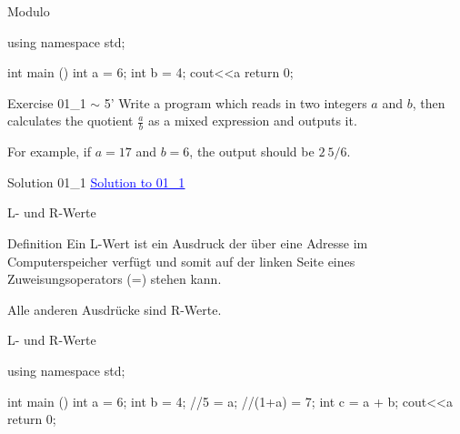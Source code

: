 \documentclass[handout,usenames,dvipsnames]{beamer}
\begin{document}
\begin{frame}[fragile]{Modulo}
\begin{TFCpp}
using namespace std;

int main (){
	int a = 6;
	int b = 4;
	cout<<a%
	return 0;
}
\end{TFCpp}

\end{frame}

\begin{frame}{Exercise 01\_1 $\sim$ 5'}
Write a program which reads in two integers $a$ and $b$, then calculates the quotient $\frac{a}{b}$ as a mixed expression and outputs it. 

\vspace{1.5ex}

For example, if $a = 17$ and $b = 6$, the output should be $2\ 5/6$.
\end{frame}

\begin{frame}{Solution 01\_1}
\href{https://codeboard.io/projects/75270}{\textcolor{blue}{\underline{Solution to 01\_1}}}
\end{frame}

\begin{frame}{L- und R-Werte}
\begin{block}{Definition}
Ein L-Wert ist ein Ausdruck der über eine Adresse im Computerspeicher verfügt und somit auf der linken Seite eines Zuweisungsoperators (=) stehen kann. 

Alle anderen Ausdrücke sind R-Werte.
\end{block}
\end{frame}

\begin{frame}[fragile]{L- und R-Werte}
\begin{TFCpp}
using namespace std;

int main (){
	int a = 6;
	int b = 4;
	//5 = a;
	//(1+a) = 7;
	int c = a + b;
	cout<<a%
	return 0;
}
\end{TFCpp}
\end{frame}
\end{document}
